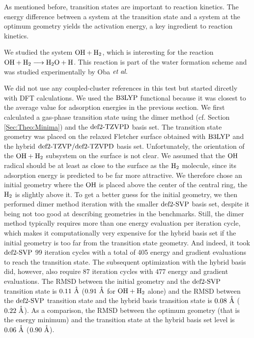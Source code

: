 As mentioned before, transition states are important to reaction kinetics.
The energy difference between a system at the transition state and a system at
the optimum geometry yields the activation energy, a key ingredient to reaction
kinetics.

We studied the system $\mbox{\ensuremath{\text O \text H+\text H_2}}$, which is interesting for the reaction
\mbox{$\mbox{\ensuremath{\text O \text H+\text H_2}}\longrightarrow\text H _2 \text O+\text H$}. This reaction is part of the water
formation scheme \cite{DishoeckHerbstNeufeld2013} and was studied
experimentally by Oba $\emph{et al.}$\cite{ObaWatanabeHamaEtAl2012}

We did not use any coupled-cluster references in this test but started
dircetly with DFT calculations. We used the $\text{B3LYP}$ functional because it was
closest to the average value for adsorption energies in the previous section.
We first calculated a gas-phase transition state using the dimer method (cf.
Section \ref{Sec:Theo:Minima}) and the $\text{def2-TZVPD}$ basis set. The transition
state geometry was placed on the relaxed Fletcher surface obtained with
$\text{B3LYP}$ and the hybrid $\text{def2-TZVP}/\text{def2-TZVPD}$ basis set. Unfortunately, the orientation
of the $\mbox{\ensuremath{\text O \text H+\text H_2}}$ subsystem on the surface is not clear. We assumed that the $\text O \text H$
radical should be at least as close to the surface as the $\text H_2$ molecule, since
its adsorption energy is predicted to be far more attractive. We therefore
chose an initial geometry where the $\text O \text H$ is placed above the center of the
central ring, the $\text H_2$ is slightly above it. To get a better guess for the
initial geometry, we then performed dimer method iteration with the smaller
$\text{def2-SVP}$ basis set, despite it being not too good at describing geometries in the
benchmarks. Still, the dimer method typically requires more than one energy
evaluation per iteration cycle, which makes it computationally very expensive
for the hybrid basis set if the initial geometry is too far from the transition
state geometry. And indeed, it took $\text{def2-SVP}$ 99 iteration cycles with a total of
405 energy and gradient evaluations to reach the transition state. The
subsequent optimization with the hybrid basis did, however, also require
87 iteration cycles with 477 energy and gradient evaluations. The RMSD between
the initial geometry and the $\text{def2-SVP}$ transition state is $0.11~\mathring{\text{A}}$
($0.91~\mathring{\text{A}}$ for $\mbox{\ensuremath{\text O \text H+\text H_2}}$ alone) and the RMSD between the $\text{def2-SVP}$
transition state and the hybrid basis transition state is $0.08~\mathring{\text{A}}$
($0.22~\mathring{\text{A}}$). As a comparison, the RMSD between the optimum geometry
(that is the energy minimum) and the transition state at the hybrid basis set
level is $0.06~\mathring{\text{A}}$ ($0.90~\mathring{\text{A}}$).

